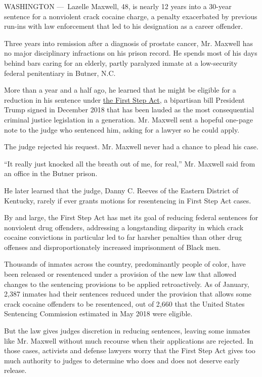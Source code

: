 WASHINGTON ---~Lazelle Maxwell, 48, is nearly 12 years into a 30-year
sentence for a nonviolent crack cocaine charge, a penalty exacerbated by
previous run-ins with law enforcement that led to his designation as a
career offender.

Three years into remission after a diagnosis of prostate cancer, Mr.
Maxwell has no major disciplinary infractions on his prison record. He
spends most of his days behind bars caring for an elderly, partly
paralyzed inmate at a low-security federal penitentiary in Butner, N.C.

More than a year and a half ago, he learned that he might be eligible
for a reduction in his sentence under
\href{https://www.nytimes.com/2018/12/14/us/politics/jared-kushner-criminal-justice-bill.html}{the
First Step Act}, a bipartisan bill President Trump signed in December
2018 that has been lauded as the most consequential criminal justice
legislation in a generation. Mr. Maxwell sent a hopeful one-page note to
the judge who sentenced him, asking for a lawyer so he could apply.

The judge rejected his request. Mr. Maxwell never had a chance to plead
his case.

``It really just knocked all the breath out of me, for real,'' Mr.
Maxwell said from an office in the Butner prison.

He later learned that the judge, Danny C. Reeves of the Eastern District
of Kentucky, rarely if ever grants motions for resentencing in First
Step Act cases.

By and large, the First Step Act has met its goal of reducing federal
sentences for nonviolent drug offenders, addressing a longstanding
disparity in which crack cocaine convictions in particular led to far
harsher penalties than other drug offenses and disproportionately
increased imprisonment of Black men.

Thousands of inmates across the country, predominantly people of color,
have been released or resentenced under a provision of the new law that
allowed changes to the sentencing provisions to be applied
retroactively. As of January, 2,387 inmates had their sentences reduced
under the provision that allows some crack cocaine offenders to be
resentenced, out of 2,660 that the United States Sentencing Commission
estimated in May 2018 were eligible.

But the law gives judges discretion in reducing sentences, leaving some
inmates like Mr. Maxwell without much recourse when their applications
are rejected. In those cases, activists and defense lawyers worry that
the First Step Act gives too much authority to judges to determine who
does and does not deserve early release.

